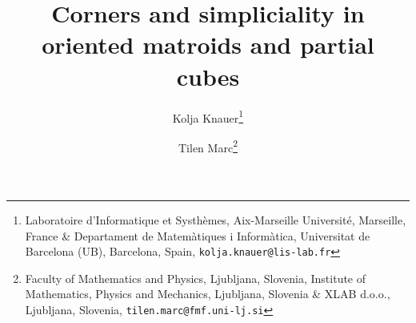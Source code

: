 \documentclass[final,11pt]{article}
\begin{document}
\title{Corners and simpliciality in oriented matroids and  partial cubes}
\author{Kolja Knauer\thanks{Laboratoire d'Informatique et Systh\`emes, Aix-Marseille Universit\'e, Marseille, France \& Departament de Matem\`atiques i Inform\`atica,
Universitat de Barcelona (UB), Barcelona, Spain,  \texttt{kolja.knauer@lis-lab.fr}} \and Tilen Marc\thanks{Faculty of Mathematics and Physics, Ljubljana, Slovenia, Institute of Mathematics, Physics and Mechanics, Ljubljana, Slovenia \& XLAB d.o.o., Ljubljana, Slovenia, \texttt{tilen.marc@fmf.uni-lj.si}}}
% 
% 
% 




\maketitle
\end{document}
